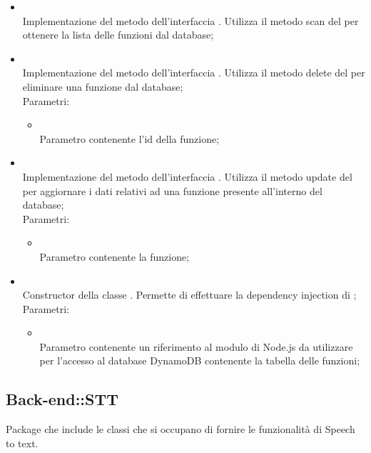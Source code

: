 \begin{itemize}
\begin{itemize}
		\item[]  \\
		Implementazione del metodo dell'interfaccia . Utilizza il metodo scan del  per ottenere la lista delle funzioni dal database;\\
		\item[]  \\
		Implementazione del metodo dell'interfaccia . Utilizza il metodo delete del  per eliminare una funzione dal database;\\
		Parametri:
		\begin{itemize}
			\item {} \\
			Parametro contenente l'id della funzione;
		\end{itemize}
		\item[]  \\
		Implementazione del metodo dell'interfaccia . Utilizza il metodo update del  per aggiornare i dati relativi ad una funzione presente all'interno del database;\\
		Parametri:
		\begin{itemize}
			\item {} \\
			Parametro contenente la funzione;
		\end{itemize}
		\item[]  \\
		Constructor della classe . Permette di effettuare la dependency injection di ;\\
		Parametri:
		\begin{itemize}
			\item {} \\
			Parametro contenente un riferimento al modulo di Node.js da utilizzare per l'accesso al database DynamoDB contenente la tabella delle funzioni;
		\end{itemize}
	\end{itemize}
\end{itemize}

\subsection{Back-end::STT}
Package che include le classi che si occupano di fornire le funzionalità di Speech to text.
